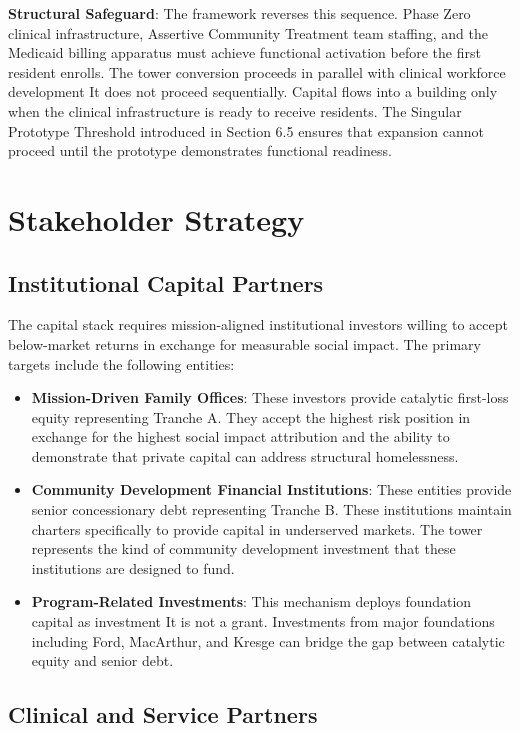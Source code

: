 \documentclass[12pt, letterpaper]{article}
\begin{document}
\textbf{Structural Safeguard}: The framework reverses this sequence. Phase Zero clinical infrastructure, Assertive Community Treatment team staffing, and the Medicaid billing apparatus must achieve functional activation before the first resident enrolls. The tower conversion proceeds in parallel with clinical workforce development It does not proceed sequentially. Capital flows into a building only when the clinical infrastructure is ready to receive residents. The Singular Prototype Threshold introduced in Section 6.5 ensures that expansion cannot proceed until the prototype demonstrates functional readiness.

\newpage
\section{Stakeholder Strategy}

\subsection{Institutional Capital Partners}

The capital stack requires mission-aligned institutional investors willing to accept below-market returns in exchange for measurable social impact. The primary targets include the following entities:

\begin{itemize}
    \item \textbf{Mission-Driven Family Offices}: These investors provide catalytic first-loss equity representing Tranche A. They accept the highest risk position in exchange for the highest social impact attribution and the ability to demonstrate that private capital can address structural homelessness.
    \item \textbf{Community Development Financial Institutions}: These entities provide senior concessionary debt representing Tranche B. These institutions maintain charters specifically to provide capital in underserved markets. The tower represents the kind of community development investment that these institutions are designed to fund.
    \item \textbf{Program-Related Investments}: This mechanism deploys foundation capital as investment It is not a grant. Investments from major foundations including Ford, MacArthur, and Kresge can bridge the gap between catalytic equity and senior debt.
\end{itemize}

\subsection{Clinical and Service Partners}
\end{document}
